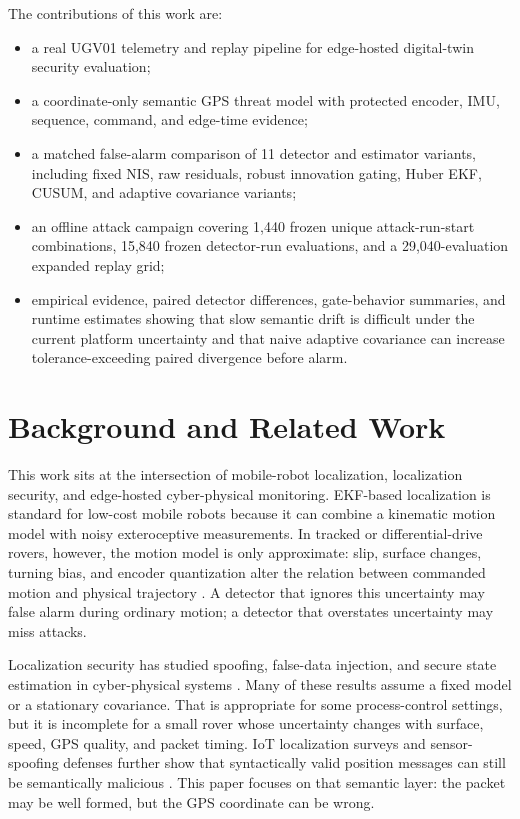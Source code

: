\documentclass[conference]{IEEEtran}
\begin{document}
The contributions of this work are:
\begin{itemize}
    \item a real UGV01 telemetry and replay pipeline for edge-hosted
    digital-twin security evaluation;
    \item a coordinate-only semantic GPS threat model with protected encoder,
    IMU, sequence, command, and edge-time evidence;
    \item a matched false-alarm comparison of 11 detector and estimator
    variants, including fixed NIS, raw residuals, robust innovation gating,
    Huber EKF, CUSUM, and adaptive covariance variants;
    \item an offline attack campaign covering 1,440 frozen unique
    attack-run-start combinations, 15,840 frozen detector-run evaluations,
    and a 29,040-evaluation expanded replay grid;
    \item empirical evidence, paired detector differences, gate-behavior
    summaries, and runtime estimates showing that slow semantic drift is
    difficult under the current platform uncertainty and that naive adaptive
    covariance can increase tolerance-exceeding paired divergence before
    alarm.
\end{itemize}

\section{Background and Related Work}
\label{sec:related_work}

This work sits at the intersection of mobile-robot localization, localization
security, and edge-hosted cyber-physical monitoring. EKF-based localization is
standard for low-cost mobile robots because it can combine a kinematic motion
model with noisy exteroceptive measurements. In tracked or differential-drive
rovers, however, the motion model is only approximate: slip, surface changes,
turning bias, and encoder quantization alter the relation between commanded
motion and physical trajectory \cite{ref11}. A detector that ignores this
uncertainty may false alarm during ordinary motion; a detector that overstates
uncertainty may miss attacks.

Localization security has studied spoofing, false-data injection, and secure
state estimation in cyber-physical systems \cite{mo2010,pasqualetti2013,fawzi2014}.
Many of these results assume a fixed model or a stationary covariance. That is
appropriate for some process-control settings, but it is incomplete for a
small rover whose uncertainty changes with surface, speed, GPS quality, and
packet timing. IoT localization surveys and sensor-spoofing defenses further
show that syntactically valid position messages can still be semantically
malicious \cite{ref43,ref60}. This paper focuses on that semantic layer: the
packet may be well formed, but the GPS coordinate can be wrong.
\end{document}
